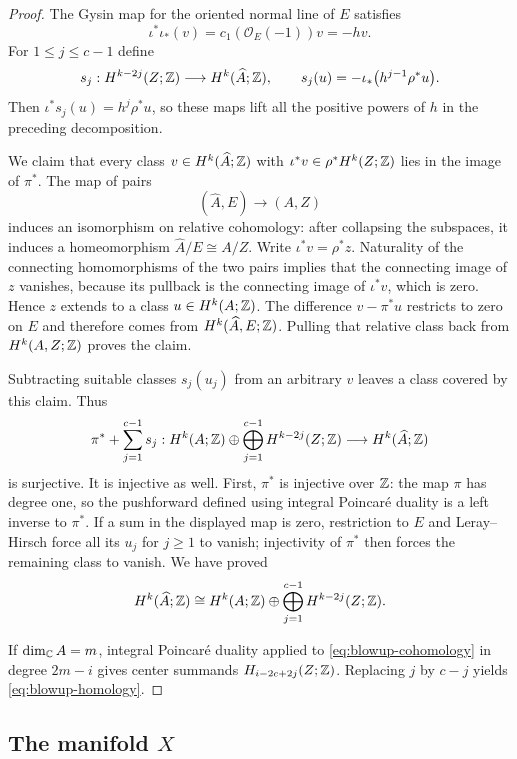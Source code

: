 \begin{proof}
The Gysin map for the oriented normal line of $E$ satisfies
\[
 \iota^*\iota_*(v)=c_1(\mathcal O_E(-1))v=-hv.
\]
For $1\leq j\leq c-1$ define
\[
 s_j:H^{k-2j}(Z;\mathbb Z)\longrightarrow H^k(\widehat A;\mathbb Z),
 \qquad s_j(u)=-\iota_*\bigl(h^{j-1}\rho^*u\bigr).
\]
Then $\iota^*s_j(u)=h^j\rho^*u$, so these maps lift all the
positive powers of $h$ in the preceding decomposition.

We claim that every class $v\in H^k(\widehat A;\mathbb Z)$ with
$\iota^*v\in\rho^*H^k(Z;\mathbb Z)$ lies in the image of $\pi^*$.
The map of pairs
\[
 (\widehat A,E)\longrightarrow(A,Z)
\]
induces an isomorphism on relative cohomology: after collapsing the
subspaces, it induces a homeomorphism
$\widehat A/E\cong A/Z$. Write $\iota^*v=\rho^*z$.
Naturality of the connecting homomorphisms of the two pairs implies
that the connecting image of $z$ vanishes, because its pullback is
the connecting image of $\iota^*v$, which is zero. Hence $z$ extends
to a class $u\in H^k(A;\mathbb Z)$. The difference $v-\pi^*u$ restricts
to zero on $E$ and therefore comes from $H^k(\widehat A,E;\mathbb Z)$.
Pulling that relative class back from $H^k(A,Z;\mathbb Z)$ proves the
claim.

Subtracting suitable classes $s_j(u_j)$ from an arbitrary $v$ leaves
a class covered by this claim. Thus
\[
 \pi^*+\sum_{j=1}^{c-1}s_j:
 H^k(A;\mathbb Z)\oplus\bigoplus_{j=1}^{c-1}H^{k-2j}(Z;\mathbb Z)
 \longrightarrow H^k(\widehat A;\mathbb Z)
\]
is surjective. It is injective as well. First, $\pi^*$ is injective
over $\mathbb Z$: the map $\pi$ has degree one, so the pushforward defined
using integral Poincar\'e duality is a left inverse to $\pi^*$.
If a sum in the displayed map is zero, restriction to $E$ and
Leray--Hirsch force all its $u_j$ for $j\geq1$ to vanish; injectivity
of $\pi^*$ then forces the remaining class to vanish. We have proved
\begin{equation}
\label{eq:blowup-cohomology}
 H^k(\widehat A;\mathbb Z)
 \cong H^k(A;\mathbb Z)\oplus
 \bigoplus_{j=1}^{c-1}H^{k-2j}(Z;\mathbb Z).
\end{equation}

If $\dim_{\mathbb C}A=m$, integral Poincar\'e duality applied to
\eqref{eq:blowup-cohomology} in degree $2m-i$ gives center summands
$H_{i-2c+2j}(Z;\mathbb Z)$. Replacing $j$ by $c-j$ yields
\eqref{eq:blowup-homology}.
\end{proof}

\subsection{The manifold \texorpdfstring{$X$}{X}}

